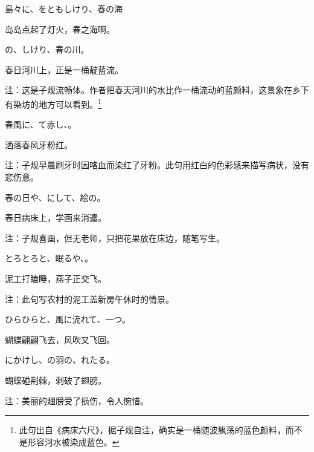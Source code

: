 \begin{haiku}
    {\FH 島々に、をともしけり、春の海}

    {\FK 岛岛点起了灯火，春之海啊。}
\end{haiku}

\begin{haiku}
    {\FH {}の、しけり、春の川。}

    {\FK 春日河川上，正是一桶靛蓝流。}

    {\FT 注：这是子规流畅体。作者把春天河川的水比作一桶流动的蓝颜料，这景象在乡下有染坊的地方可以看到。\footnote{\FT 此句出自《病床六尺》，据子规自注，确实是一桶随波飘荡的蓝色颜料，而不是形容河水被染成蓝色。}}
\end{haiku}

\begin{haiku}
    {\FH 春風に、て赤し、。}

    {\FK 洒落春风牙粉红。}

    {\FT 注：子规早晨刷牙时因咯血而染红了牙粉。此句用红白的色彩感来描写病状，没有悲伤意。}
\end{haiku}

\begin{haiku}
    {\FH 春の日や、にして、絵の。}

    {\FK 春日病床上，学画来消遣。}

    {\FT 注：子规喜画，但无老师，只把花果放在床边，随笔写生。}
\end{haiku}

\begin{haiku}
    {\FH とろとろと、眠るや、。}

    {\FK 泥工打瞌睡，燕子正交飞。}

    {\FT 注：此句写农村的泥工盖新房午休时的情景。}
\end{haiku}

\begin{haiku}
    {\FH ひらひらと、風に流れて、一つ。}

    {\FK 蝴蝶翩翩飞去，风吹又飞回。}
\end{haiku}

\begin{haiku}
    {\FH {}にかけし、の羽の、れたる。}

    {\FK 蝴蝶碰荆棘，刺破了翅膀。}

    {\FT 注：美丽的翅膀受了损伤，令人惋惜。}
\end{haiku}

